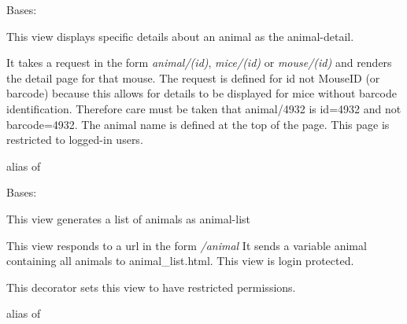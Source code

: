 \documentclass[letterpaper,10pt,english]{sphinxmanual}
\begin{document}
\begin{fulllineitems}
\label{api:mousedb.animal.views.AnimalDetail}
Bases: {\hyperref[api:mousedb.views.ProtectedDetailView]{}}

This view displays specific details about an animal as the animal-detail.

It takes a request in the form \emph{animal/(id)}, \emph{mice/(id)} or \emph{mouse/(id)} and renders the detail page for that mouse.  The request is defined for id not MouseID (or barcode) because this allows for details to be displayed for mice without barcode identification.
Therefore care must be taken that animal/4932 is id=4932 and not barcode=4932.  The animal name is defined at the top of the page.
This page is restricted to logged-in users.


\begin{fulllineitems}
\label{api:mousedb.animal.views.AnimalDetail.model}
alias of 

\end{fulllineitems}


\end{fulllineitems}



\begin{fulllineitems}
\label{api:mousedb.animal.views.AnimalList}
Bases: {\hyperref[api:mousedb.views.ProtectedListView]{}}

This view generates a list of animals as animal-list

This view responds to a url in the form \emph{/animal}
It sends a variable animal containing all animals to animal\_list.html.
This view is login protected.


\begin{fulllineitems}
\label{api:mousedb.animal.views.AnimalList.dispatch}
This decorator sets this view to have restricted permissions.

\end{fulllineitems}



\begin{fulllineitems}
\label{api:mousedb.animal.views.AnimalList.model}
alias of 

\end{fulllineitems}


\end{fulllineitems}
\end{document}
